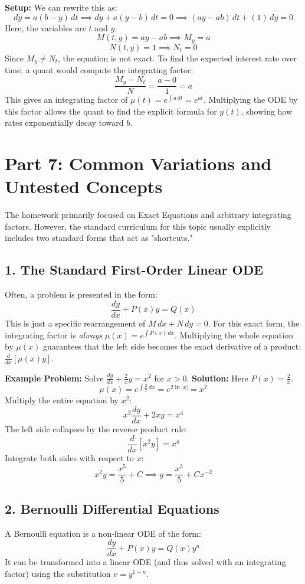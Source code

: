 \documentclass[11pt]{article}
\begin{document}
\textbf{Setup:} We can rewrite this as:
\[ dy = a(b - y) \, dt \implies dy + a(y - b) \, dt = 0 \implies (ay - ab) \, dt + (1) \, dy = 0 \]
Here, the variables are $t$ and $y$.
\[ M(t,y) = ay - ab \implies M_y = a \]
\[ N(t,y) = 1 \implies N_t = 0 \]
Since $M_y \neq N_t$, the equation is not exact. To find the expected interest rate over time, a quant would compute the integrating factor:
\[ \frac{M_y - N_t}{N} = \frac{a - 0}{1} = a \]
This gives an integrating factor of $\mu(t) = e^{\int a \, dt} = e^{at}$. Multiplying the ODE by this factor allows the quant to find the explicit formula for $y(t)$, showing how rates exponentially decay toward $b$.

\newpage
\section{Part 7: Common Variations and Untested Concepts}

The homework primarily focused on Exact Equations and arbitrary integrating factors. However, the standard curriculum for this topic usually explicitly includes two standard forms that act as "shortcuts."

\subsection{1. The Standard First-Order Linear ODE}
Often, a problem is presented in the form:
\[ \frac{dy}{dx} + P(x)y = Q(x) \]
This is just a specific rearrangement of $M \, dx + N \, dy = 0$. For this exact form, the integrating factor is \emph{always} $\mu(x) = e^{\int P(x) \, dx}$. Multiplying the whole equation by $\mu(x)$ guarantees that the left side becomes the exact derivative of a product: $\frac{d}{dx}[\mu(x)y]$.

\textbf{Example Problem:} Solve $\frac{dy}{dx} + \frac{2}{x}y = x^2$ for $x > 0$.
\textbf{Solution:} 
Here $P(x) = \frac{2}{x}$. 
\[ \mu(x) = e^{\int \frac{2}{x} \, dx} = e^{2\ln|x|} = x^2 \]
Multiply the entire equation by $x^2$:
\[ x^2\frac{dy}{dx} + 2xy = x^4 \]
The left side collapses by the reverse product rule:
\[ \frac{d}{dx}[x^2y] = x^4 \]
Integrate both sides with respect to $x$:
\[ x^2y = \frac{x^5}{5} + C \implies y = \frac{x^3}{5} + Cx^{-2} \]

\subsection{2. Bernoulli Differential Equations}
A Bernoulli equation is a non-linear ODE of the form:
\[ \frac{dy}{dx} + P(x)y = Q(x)y^n \]
It can be transformed into a linear ODE (and thus solved with an integrating factor) using the substitution $v = y^{1-n}$.
\end{document}
